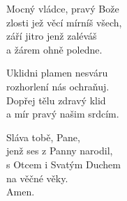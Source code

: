 \begin{translatioMulticol}{3}
Mocný vládce, pravý Bože\\
zlosti jež věcí mírníš všech,\\
září jitro jenž zaléváš\\
a žárem ohně poledne.\columnbreak

Uklidni plamen nesváru\\
rozhorlení nás ochraňuj.\\
Dopřej tělu zdravý klid\\
a mír pravý našim srdcím.\columnbreak

Sláva tobě, Pane,\\
jenž ses z Panny narodil,\\
s Otcem i Svatým Duchem\\
na věčné věky.\\
Amen.
\end{translatioMulticol}
